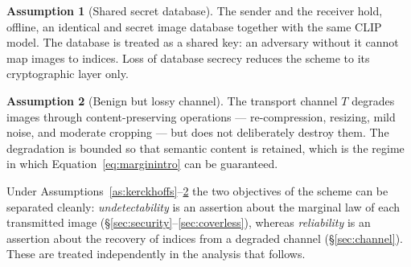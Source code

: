 \documentclass[11pt]{article}
\theoremstyle{definition}
\newtheorem{assumption}{Assumption}[section]
\newcommand{\Eqn}[1]{Equation~\eqref{#1}}
\begin{document}
\begin{assumption}[Shared secret database]\label{as:db}
The sender and the receiver hold, offline, an identical and secret image database
together with the same CLIP model. The database is treated as a shared key: an
adversary without it cannot map images to indices. Loss of database secrecy reduces
the scheme to its cryptographic layer only.
\end{assumption}

\begin{assumption}[Benign but lossy channel]\label{as:channel}
The transport channel $T$ degrades images through content-preserving operations
--- re-compression, resizing, mild noise, and moderate cropping --- but does not
deliberately destroy them. The degradation is bounded so that semantic content is
retained, which is the regime in which \Eqn{eq:marginintro} can be guaranteed.
\end{assumption}

Under Assumptions~\ref{as:kerckhoffs}--\ref{as:channel} the two objectives of the
scheme can be separated cleanly: \emph{undetectability} is an assertion about the
marginal law of each transmitted image (\S\ref{sec:security}--\ref{sec:coverless}),
whereas \emph{reliability} is an assertion about the recovery of indices from a
degraded channel (\S\ref{sec:channel}). These are treated independently in the
analysis that follows.
\end{document}
